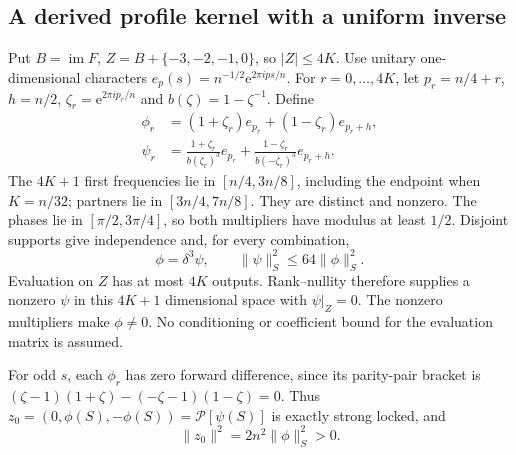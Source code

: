 \documentclass[11pt,a4paper]{article}
\newcommand{\norm}[1]{\lVert#1\rVert}
\newcommand{\im}{\operatorname{im}}
\newcommand{\e}{\mathrm e}
\begin{document}
\subsection{A derived profile kernel with a uniform inverse}
Put $B=\im F$, $Z=B+\{-3,-2,-1,0\}$, so $|Z|\leq4K$.
Use unitary one-dimensional characters $e_p(s)=n^{-1/2}\e^{2\pi ips/n}$.
For $r=0,\ldots,4K$, let $p_r=n/4+r$, $h=n/2$,
$\zeta_r=\e^{2\pi ip_r/n}$ and $b(\zeta)=1-\zeta^{-1}$. Define
\begin{align*}
 \phi_r&=(1+\zeta_r)e_{p_r}+(1-\zeta_r)e_{p_r+h},\\
 \psi_r&=\frac{1+\zeta_r}{b(\zeta_r)^3}e_{p_r}
           +\frac{1-\zeta_r}{b(-\zeta_r)^3}e_{p_r+h}.
\end{align*}
The $4K+1$ first frequencies lie in $[n/4,3n/8]$, including the endpoint
when $K=n/32$; partners lie in $[3n/4,7n/8]$. They are distinct and nonzero.
The phases lie in $[\pi/2,3\pi/4]$, so both multipliers have modulus at
least $1/2$. Disjoint supports give independence and, for every combination,
\begin{equation}\label{inverse}
 \phi=\delta^3\psi,\qquad \norm\psi_S^2\leq64\norm\phi_S^2.
\end{equation}
Evaluation on $Z$ has at most $4K$ outputs. Rank--nullity therefore supplies
a nonzero $\psi$ in this $4K+1$ dimensional space with $\psi|_Z=0$.
The nonzero multipliers make $\phi\ne0$. No conditioning or coefficient bound
for the evaluation matrix is assumed.

For odd $s$, each $\phi_r$ has zero forward difference, since its parity-pair
bracket is
$(\zeta-1)(1+\zeta)-(-\zeta-1)(1-\zeta)=0$. Thus
$z_0=(0,\phi(S),-\phi(S))=\mathcal P[\psi(S)]$ is exactly strong locked,
and
\begin{equation}\label{base}
 \norm{z_0}^2=2n^2\norm\phi_S^2>0.
\end{equation}
\end{document}
